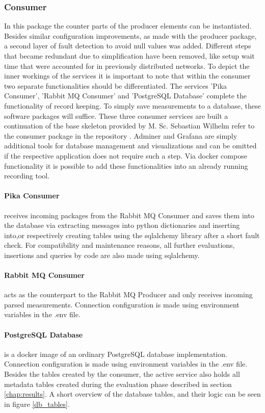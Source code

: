 \subsubsection{Consumer}
 In this package the counter parts of the producer elements can be instantiated. Besides similar configuration improvements, as made with the producer package, a second layer of fault detection to avoid null values was added. Different steps that became redundant due to simplification have been removed, like setup wait time that were accounted for in previously distributed networks. To depict the inner workings of the services it is important to note that within the consumer two separate functionalities should be differentiated. The services 'Pika Consumer', 'Rabbit MQ Consumer' and 'PostgreSQL Database' complete the functionality of record keeping. To simply save measurements to a database, these software packages will suffice. These three consumer services are built a continuation of the base skeleton provided by M. Sc. Sebastian Wilhelm refer to the consumer package in the repository \cite{wilhelm_repo}. Adminer and Grafana are simply additional tools for database management and visualizations and can be omitted if the respective application does not require such a step. Via docker compose functionality it is possible to add these functionalities into an already running recording tool.

\paragraph{Pika Consumer} receives incoming packages from the Rabbit MQ Consumer and saves them into the database via extracting messages into python dictionaries and inserting into,or respectively creating tables using the sqlalchemy library after a short fault check. For compatibility and maintenance reasons, all further evaluations, insertions and queries by code are also made using sqlalchemy. 

\paragraph{Rabbit MQ Consumer} acts as the counterpart to the Rabbit MQ Producer and only receives incoming parsed measurements. Connection configuration is made using environment variables in the .env file.
	
\paragraph{PostgreSQL Database} is a docker image of an ordinary PostgreSQL database implementation. Connection configuration is made using environment variables in the .env file. Besides the tables created by the consumer, the active service also holds all metadata tables created during the evaluation phase described in section \ref{chap:results}. A short overview of the database tables, and their logic can be seen in figure \ref{db_tables}.

